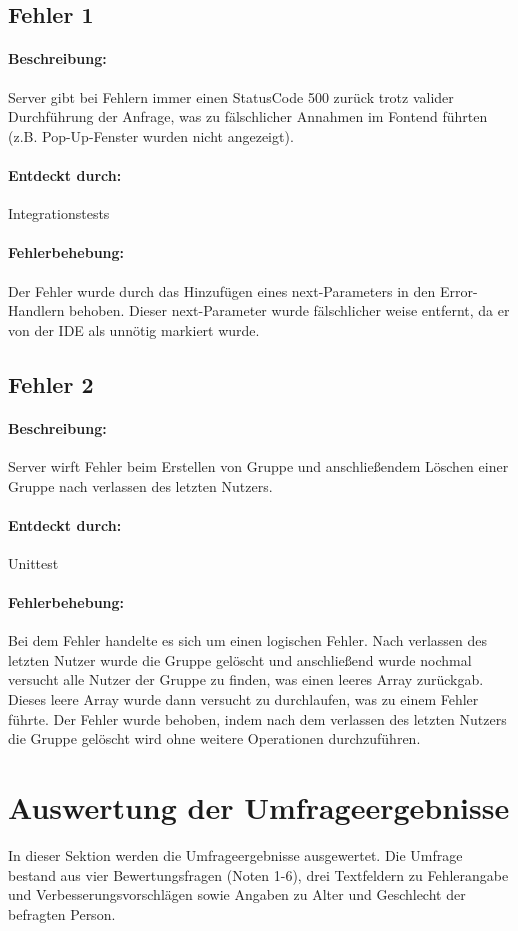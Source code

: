 \documentclass{qualitätssicherungsheft}
\begin{document}
\subsection{Fehler 1}
\paragraph*{Beschreibung:} Server gibt bei Fehlern immer einen StatusCode 500 zurück trotz valider Durchführung der Anfrage, was zu fälschlicher Annahmen im Fontend führten (z.B. Pop-Up-Fenster wurden nicht angezeigt). 
\paragraph*{Entdeckt durch:} Integrationstests
\paragraph*{Fehlerbehebung:} Der Fehler wurde durch das Hinzufügen eines
next-Parameters in den Error-Handlern behoben. Dieser next-Parameter wurde fälschlicher weise entfernt, da er von der IDE als unnötig markiert wurde. 

\subsection{Fehler 2}
\paragraph*{Beschreibung:} Server wirft Fehler beim Erstellen von Gruppe und anschließendem Löschen einer Gruppe nach verlassen des letzten Nutzers.
\paragraph*{Entdeckt durch:} Unittest
\paragraph*{Fehlerbehebung:} Bei dem Fehler handelte es sich um einen logischen Fehler. Nach verlassen des letzten Nutzer wurde die Gruppe gelöscht und anschließend wurde nochmal versucht alle Nutzer der Gruppe zu finden, was einen leeres Array zurückgab. Dieses leere Array wurde dann versucht zu durchlaufen, was zu einem Fehler führte. Der Fehler wurde behoben, indem nach dem verlassen des letzten Nutzers die Gruppe gelöscht wird ohne weitere Operationen durchzuführen.

\section{Auswertung der Umfrageergebnisse}
In dieser Sektion werden die Umfrageergebnisse ausgewertet. Die Umfrage bestand aus vier Bewertungsfragen (Noten 1-6), drei Textfeldern zu Fehlerangabe und Verbesserungsvorschlägen sowie Angaben zu Alter und Geschlecht der befragten Person.
\end{document}
